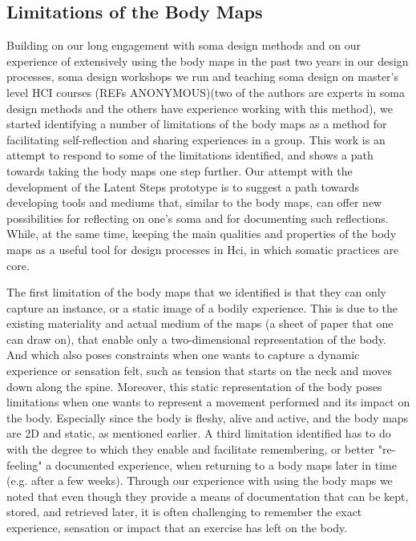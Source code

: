 \subsection{Limitations of the Body Maps}
Building on our long engagement with soma design methods and on our experience of extensively using the body maps in the past two years in our design processes, soma design workshops we run and teaching soma design on master's level HCI courses (REFs ANONYMOUS)(two of the authors are experts in soma design methods and the others have experience working with this method), we started identifying a number of limitations of the body maps as a method for facilitating self-reflection and sharing experiences in a group. This work is an attempt to respond to some of the limitations identified, and shows a path towards taking the body maps one step further. Our attempt with the development of the Latent Steps prototype is to suggest a path towards developing tools and mediums that, similar to the body maps, can offer new possibilities for reflecting on one's soma and for documenting such reflections. While, at the same time, keeping the main qualities and properties of the body maps as a useful tool for design processes in Hci, in which somatic practices are core. 

The first limitation of the body maps that we identified is that they can only capture an instance, or a static image of a bodily experience. This is due to the existing materiality and actual medium of the maps (a sheet of paper that one can draw on), that enable only a two-dimensional representation of the body. And which also poses constraints when one wants to capture a dynamic experience or sensation felt, such as tension that starts on the neck and moves down along the spine. Moreover, this static representation of the body poses limitations when one wants to represent a movement performed and its impact on the body. Especially since the body is fleshy, alive and active, and the body maps are 2D and static, as mentioned earlier. A third limitation identified has to do with the degree to which they enable and facilitate remembering, or better "re-feeling" a documented experience, when returning to a body maps later in time (e.g. after a few weeks). Through our experience with using the body maps we noted that even though they provide a means of documentation that can be kept, stored, and retrieved later, it is often challenging to remember the exact experience, sensation or impact that an exercise has left on the body. 

